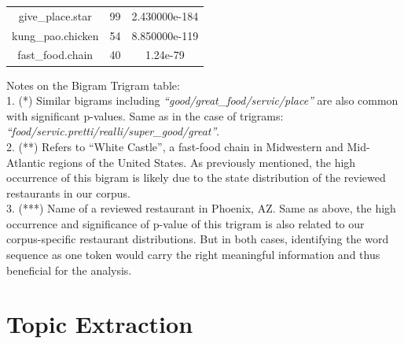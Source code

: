 \documentclass[12pt,twoside]{dukestatscithesis}
\theoremstyle{definition}
\theoremstyle{definition}
\theoremstyle{definition}
\theoremstyle{remark}
\begin{document}
\begin{longtable}[]{@{}ccc@{}}
\begin{minipage}[t]{0.31\columnwidth}
give\_place.star\strut
\end{minipage} & \begin{minipage}[t]{0.44\columnwidth}\centering\strut
99\strut
\end{minipage} & \begin{minipage}[t]{0.17\columnwidth}\centering\strut
2.430000e-184\strut
\end{minipage}\tabularnewline
\begin{minipage}[t]{0.31\columnwidth}\centering\strut
kung\_pao.chicken\strut
\end{minipage} & \begin{minipage}[t]{0.44\columnwidth}\centering\strut
54\strut
\end{minipage} & \begin{minipage}[t]{0.17\columnwidth}\centering\strut
8.850000e-119\strut
\end{minipage}\tabularnewline
\begin{minipage}[t]{0.31\columnwidth}\centering\strut
fast\_food.chain\strut
\end{minipage} & \begin{minipage}[t]{0.44\columnwidth}\centering\strut
40\strut
\end{minipage} & \begin{minipage}[t]{0.17\columnwidth}\centering\strut
1.24e-79\strut
\end{minipage}\tabularnewline
\bottomrule
\end{longtable}
Notes on the Bigram Trigram table:\\
1. (*) Similar bigrams including
\emph{``good/great\_food/servic/place''} are also common with
significant p-values. Same as in the case of trigrams:
\emph{``food/servic.pretti/realli/super\_good/great''}.\\
2. (**) Refers to ``White Castle'', a fast-food chain in Midwestern and
Mid-Atlantic regions of the United States. As previously mentioned, the
high occurrence of this bigram is likely due to the state distribution
of the reviewed restaurants in our corpus.\\
3. (***) Name of a reviewed restaurant in Phoenix, AZ. Same as above,
the high occurrence and significance of p-value of this trigram is also
related to our corpus-specific restaurant distributions. But in both
cases, identifying the word sequence as one token would carry the right
meaningful information and thus beneficial for the analysis.

\section{Topic Extraction}\label{topic-extraction-1}
\end{document}
